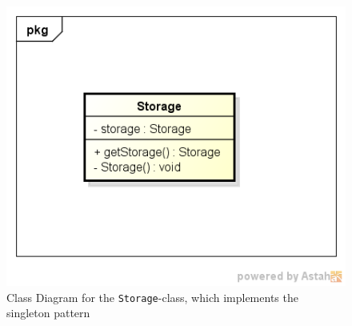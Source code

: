 \documentclass[a4paper]{scrreprt}
\begin{document}
\begin{figure}[h]
  \begin{center}
    \includegraphics[scale=1.0]{ClassDiagramStorage.png}
    \caption{Class Diagram for the \texttt{Storage}-class, which implements the singleton pattern}
    \label{fig:diagstorage}
  \end{center}
\end{figure}
\end{document}
